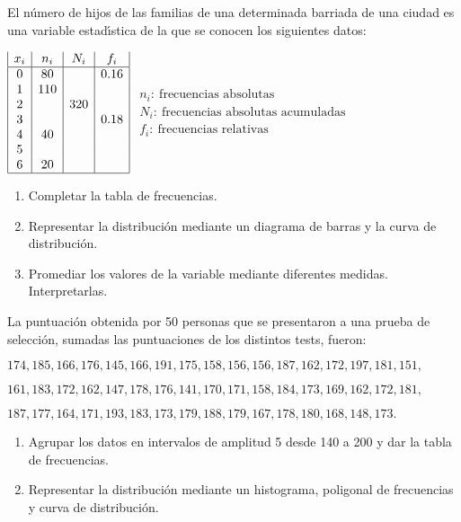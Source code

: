 \documentclass[hidequestions]{homework}
\begin{document}
	
	
	
	\problem
	El n{\'u}mero de hijos de las familias de una determinada
	barriada de una ciudad es una variable estad{\'\i}stica de la que se
	conocen los siguientes datos:
	
	\hskip 3cm $\begin{array}{|c|c|c|c|}
	x_{i} & n_{i} & N_{i} & f_{i}
	\\   \hline
	0 & 80  &     & 0\mbox{.}16 \\
	1 & 110 &     &      \\
	2 &     & 320 &      \\
	3 &     &     & 0\mbox{.}18 \\
	4 & 40  &     &      \\
	5 &     &     &      \\
	6 & 20  &     &  \\ \hline
	\end{array}$   \hskip 1.5cm $\begin{array}{l}  n_i: \ \mbox{frecuencias absolutas} \\ N_i:  \ \mbox{frecuencias absolutas acumuladas}\\ f_i:  \ \mbox{frecuencias relativas}\end{array}$
	\begin{enumerate}
		\item Completar la tabla de frecuencias.
		\item Representar la distribuci{\'o}n mediante un diagrama de
		barras y la curva de distribuci{\'o}n.
		\item Promediar los valores de la variable mediante diferentes
		medidas. Interpretarlas. \\
	\end{enumerate}
	
	\color{black}
	
	
	
	
	\problem
	La puntuaci{\'o}n obtenida por 50 personas que se presentaron a  una  prueba
	de selecci{\'o}n, sumadas las puntuaciones de los distintos tests, fueron:
	
	\smallskip
	\centerline{$174,185,166,176,145,166,191,175,158,156,156,187,162,172,197,181,151,$}
	\smallskip
	\centerline{$161,183,172,162,147,178,176,141,170,171,158,184,173,169,162,172,181,$}
	\smallskip
	\centerline{$187,177,164,171,193,183,173,179,188,179,167,178,180,168,148,173.$}
	\vskip -1cm
	\begin{enumerate}
		\item Agrupar los datos en intervalos de amplitud 5 desde 140 a 200 y dar la tabla de frecuencias.
		\item Representar la distribuci{\'o}n mediante un histograma, poligonal de
		frecuencias y curva de distribuci{\'o}n. \\
	\end{enumerate}
	
\end{document}
